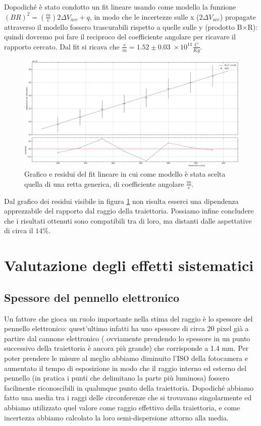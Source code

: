 \documentclass[10pt, a4paper, italian]{article}
\begin{document}
Dopodiché è stato condotto un fit lineare usando come modello la funzione $(BR)^2 = (\frac{m}{e})2\Delta V_{acc} +q$, in modo che le incertezze sulle x ($2\Delta V_{acc}$) propagate attraverso il modello fossero trascurabili rispetto a quelle sulle y (prodotto B$\times$R): quindi dovremo poi fare il reciproco del coefficiente angolare per ricavare il rapporto cercato. Dal fit si ricava che $\frac{e}{m}=1.52 \pm 0.03 \; \times 10^{11} \frac{C}{Kg}$.
\begin{figure}
\includegraphics[width=\textwidth]{linfit}
\caption{\label{fig:linfit}Grafico e residui del fit lineare in cui come modello è stata scelta quella di una retta generica, di coefficiente angolare $\frac{m}{e}$.}
\end{figure}
Dal grafico dei residui visibile in figura \ref{fig:linfit} non risulta esserci una dipendenza apprezzabile del rapporto dal raggio della traiettoria.
Possiamo infine concludere che i risultati ottenuti sono compatibili tra di loro, ma distanti dalle aspettative di circa il $14 \percent$.

\section{Valutazione degli effetti sistematici}

\subsection{Spessore del pennello elettronico}
Un fattore che gioca un ruolo importante nella stima del raggio è lo spessore del pennello elettronico: quest'ultimo infatti ha uno spessore di circa 20 pixel già a partire dal cannone elettronico ( ovviamente prendendo lo spessore in un punto successivo della traiettoria è ancora più grande) che corrisponde a 1.4 mm. Per poter prendere le misure al meglio abbiamo diminuito l'ISO della fotocamera e aumentato il tempo di esposizione in modo che il raggio interno ed esterno del pennello (in pratica i punti che delimitano la parte più luminosa) fossero facilmente riconoscibili in qualunque punto della traiettoria. Dopodiché abbiamo fatto una media tra i raggi delle circonferenze che si trovavano singolarmente ed abbiamo utilizzato quel valore come raggio effettivo della traiettoria, e come incertezza abbiamo calcolato la loro semi-dispersione attorno alla media.
\end{document}
